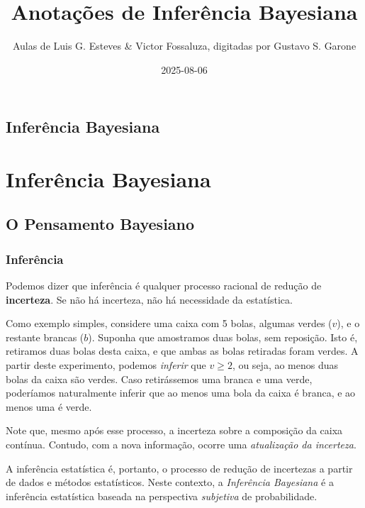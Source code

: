 \documentclass[
  portuguese,
  letterpaper,
  DIV=11,
  numbers=noendperiod]{scrreport}
\title{Anotações de Inferência Bayesiana}
\author{Aulas de Luis G. Esteves \& Victor Fossaluza, digitadas por
Gustavo S. Garone}
\date{2025-08-06}
\renewcommand*\contentsname{Índice}
\newcommand\contentsname{Índice}
\begin{document}
\maketitle

\renewcommand*\contentsname{Índice}
{
\hypersetup{linkcolor=}
\setcounter{tocdepth}{2}
\tableofcontents
}


\chapter{Inferência Bayesiana}\label{inferuxeancia-bayesiana}

\part{Inferência Bayesiana}

\chapter{O Pensamento Bayesiano}\label{o-pensamento-bayesiano}

\section{Inferência}\label{inferuxeancia}

Podemos dizer que inferência é qualquer processo racional de redução de
\textbf{incerteza}. Se não há incerteza, não há necessidade da
estatística.

Como exemplo simples, considere uma caixa com 5 bolas, algumas verdes
(\(v\)), e o restante brancas (\(b\)). Suponha que amostramos duas
bolas, sem reposição. Isto é, retiramos duas bolas desta caixa, e que
ambas as bolas retiradas foram verdes. A partir deste experimento,
podemos \emph{inferir} que \(v \geq 2\), ou seja, ao menos duas bolas da
caixa são verdes. Caso retirássemos uma branca e uma verde, poderíamos
naturalmente inferir que ao menos uma bola da caixa é branca, e ao menos
uma é verde.

Note que, mesmo após esse processo, a incerteza sobre a composição da
caixa contínua. Contudo, com a nova informação, ocorre uma
\emph{atualização da incerteza}.

A inferência estatística é, portanto, o processo de redução de
incertezas a partir de dados e métodos estatísticos. Neste contexto, a
\emph{Inferência Bayesiana} é a inferência estatística baseada na
perspectiva \emph{subjetiva} de probabilidade.
\end{document}
